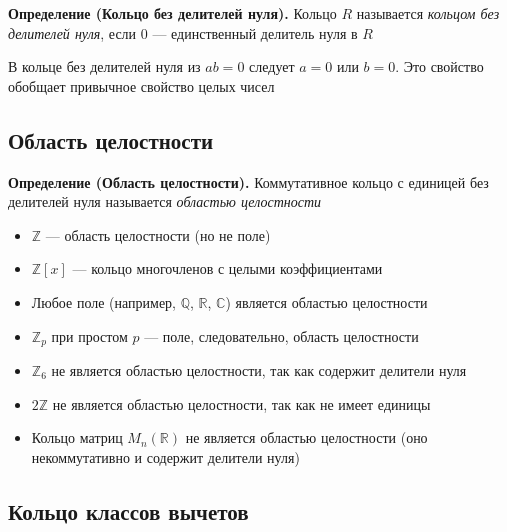 \documentclass[a4paper,12pt]{article}
\theoremstyle{definition}
\theoremstyle{plain}
\theoremstyle{remark}
\begin{document}
	\noindent \textbf{Определение (Кольцо без делителей нуля).}
	Кольцо $R$ называется \textit{кольцом без делителей нуля}, если $0$ — единственный делитель нуля в $R$
	
	\begin{tcolorbox}[colback=yellow!5, colframe=orange!60!black, title=Замечание]
		В кольце без делителей нуля из $ab = 0$ следует $a = 0$ или $b = 0$. Это свойство обобщает привычное свойство целых чисел
	\end{tcolorbox}
	
	\subsection{Область целостности}
	
	\noindent \textbf{Определение (Область целостности).}
	Коммутативное кольцо с единицей без делителей нуля называется \textit{областью целостности}
	
	\begin{tcolorbox}[colback=gray!5, colframe=gray!50, title=Примеры областей целостности]
		\begin{itemize}
			\item $\mathbb{Z}$ — область целостности (но не поле)
			\item $\mathbb{Z}[x]$ — кольцо многочленов с целыми коэффициентами
			\item Любое поле (например, $\mathbb{Q}$, $\mathbb{R}$, $\mathbb{C}$) является областью целостности
			\item $\mathbb{Z}_p$ при простом $p$ — поле, следовательно, область целостности
		\end{itemize}
	\end{tcolorbox}
	
	\begin{tcolorbox}[colback=yellow!5, colframe=orange!60!black, title=Контрпримеры]
		\begin{itemize}
			\item $\mathbb{Z}_6$ не является областью целостности, так как содержит делители нуля
			\item $2\mathbb{Z}$ не является областью целостности, так как не имеет единицы
			\item Кольцо матриц $M_n(\mathbb{R})$ не является областью целостности (оно некоммутативно и содержит делители нуля)
		\end{itemize}
	\end{tcolorbox}
	
	\subsection{Кольцо классов вычетов}
	
\end{document}
